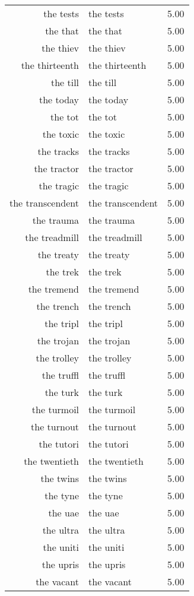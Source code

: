 \begin{table}[ht]
\begin{tabular}{rlr}
  the tests & the tests & 5.00 \\ 
  the that & the that & 5.00 \\ 
  the thiev & the thiev & 5.00 \\ 
  the thirteenth & the thirteenth & 5.00 \\ 
  the till & the till & 5.00 \\ 
  the today & the today & 5.00 \\ 
  the tot & the tot & 5.00 \\ 
  the toxic & the toxic & 5.00 \\ 
  the tracks & the tracks & 5.00 \\ 
  the tractor & the tractor & 5.00 \\ 
  the tragic & the tragic & 5.00 \\ 
  the transcendent & the transcendent & 5.00 \\ 
  the trauma & the trauma & 5.00 \\ 
  the treadmill & the treadmill & 5.00 \\ 
  the treaty & the treaty & 5.00 \\ 
  the trek & the trek & 5.00 \\ 
  the tremend & the tremend & 5.00 \\ 
  the trench & the trench & 5.00 \\ 
  the tripl & the tripl & 5.00 \\ 
  the trojan & the trojan & 5.00 \\ 
  the trolley & the trolley & 5.00 \\ 
  the truffl & the truffl & 5.00 \\ 
  the turk & the turk & 5.00 \\ 
  the turmoil & the turmoil & 5.00 \\ 
  the turnout & the turnout & 5.00 \\ 
  the tutori & the tutori & 5.00 \\ 
  the twentieth & the twentieth & 5.00 \\ 
  the twins & the twins & 5.00 \\ 
  the tyne & the tyne & 5.00 \\ 
  the uae & the uae & 5.00 \\ 
  the ultra & the ultra & 5.00 \\ 
  the uniti & the uniti & 5.00 \\ 
  the upris & the upris & 5.00 \\ 
  the vacant & the vacant & 5.00 \\ 

\end{tabular}
\end{table}
